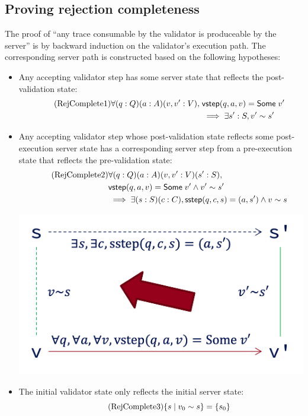 \subsection{Proving rejection completeness}
The proof of ``any trace consumable by the validator is produceable by
the server'' is by backward induction on the validator's execution
path.  The corresponding server path is constructed based on the
following hypotheses:

\begin{itemize}
\item Any accepting validator step has some server state that reflects the
  post-validation state:
  \begin{align*}
    \tag{RejComplete1}
    \label{eq:rc1}
    \forall(q:Q)(a:A)(v, v':V),\;&\mathsf{vstep}(q,a,v)=\mathsf{Some}\;v'\\
    &\implies\exists s':S,v'\sim s' 
  \end{align*}
\item Any accepting validator step whose post-validation state reflects some
  post-execution server state has a corresponding server step from a
  pre-execution state that reflects the pre-validation state:
  \begin{align*}
    \tag{RejComplete2}
    \label{eq:rc2}
    &\forall(q:Q)(a:A)(v,v':V)(s':S),\\
    &\mathsf{vstep}(q,a,v)=\mathsf{Some}\;v'\wedge v'\sim s'\\
    &\implies\exists(s:S)(c:C),\mathsf{sstep}(q,c,s)=(a,s')\wedge v\sim s
  \end{align*}
  \begin{center}
    \includegraphics[width=.5\textwidth]{figures/complete}
  \end{center}

\item The initial validator state only reflects the initial server state:
  \begin{equation}
    \tag{RejComplete3}
    \label{eq:rc3}
    \{s\mid v_0\sim s\}=\{s_0\}
  \end{equation}
\end{itemize}

